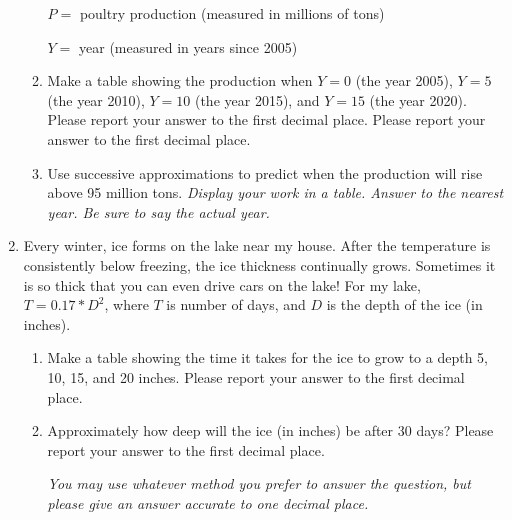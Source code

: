 \documentclass[12pt]{article}
\begin{document}
\begin{enumerate}
\begin{enumerate}
\quad $P= $ poultry production (measured in millions of tons)

\quad $Y = $ year (measured in years since 2005)

\vfill
\item Make a table showing the production when $Y=0$ (the year 2005), $Y=5$ (the year 2010), $Y=10$ (the year 2015), and $Y=15$ (the year 2020). Please report your answer to the first decimal place. Please report your answer to the first decimal place.
\vfill

\item Use successive approximations to predict when the production will rise above 95 million tons.  \emph{Display your work in a table.  Answer to the nearest year.  Be sure to say the actual year.}
\vfill
\vfill
\end{enumerate}

\newpage
\item Every winter, ice forms on the lake near my house.  After the temperature is consistently below freezing, the ice thickness continually grows.  Sometimes it is so thick that you can even drive cars on the lake!  For my lake, $T=0.17* D^2$, where $T$ is number of days, and $D$ is the depth of the ice (in inches). 
\begin{enumerate}
\item Make a table showing the time it takes for the ice to grow to a depth 5, 10, 15, and 20 inches.  Please report your answer to the first decimal place.
\vfill
\item Approximately how deep will the ice (in inches) be after 30 days? Please report your answer to the first decimal place.

\emph{You may use whatever method you prefer to answer the question, but please give an answer accurate to one decimal place.}
\vfill
\end{enumerate}


\end{enumerate}
\end{document}
